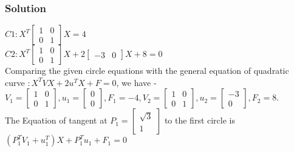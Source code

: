 \documentclass{beamer}
\begin{document}

\begin{frame}
\frametitle{Solution}
$C1 : X^{T}
\begin{bmatrix}
    1 & 0 \\
    0 & 1
\end{bmatrix} X = 4$
\\
$C2 :X^{T}\begin{bmatrix}
1 & 0 \\ 0 & 1
\end{bmatrix}X +2\begin{bmatrix}
-3 & 0
\end{bmatrix}X+8=0 $
\\Comparing the given circle equations with the general equation of quadratic curve 
$: X^{T}VX + 2u^{T}X + F = 0$, we have - 
\\
$ V_{1}= \begin{bmatrix}1 & 0 \\0 & 1
\end{bmatrix}, u_{1} = \begin{bmatrix}
0 \\ 0
\end{bmatrix} , F_{1} = -4 , V_{2} = \begin{bmatrix}1 & 0 \\0 & 1
\end{bmatrix}, u_{2} = \begin{bmatrix}
-3 \\ 0
\end{bmatrix}, F_{2} = 8.$
\\ The Equation of tangent at $P_{1} = \begin{bmatrix}
\sqrt{3} \\1
\end{bmatrix}$ to the first circle is \\$ (P_{1}^{T}V_{1} + u_{1}^{T} )X + P_{1}^{T}u_{1} + F_{1} = 0$

\end{frame}
\end{document}

